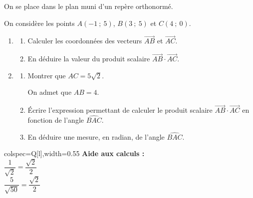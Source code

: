 On se place dans le plan muni d'un repère orthonormé.

On considère les points $A(-1\ ;\ 5)$, $B(3\ ;\ 5)$ et $C(4\ ;\ 0)$.

\begin{enumerate}
\item \begin{enumerate}
\item Calculer les coordonnées des vecteurs $\overrightarrow{AB}$ et $\overrightarrow{AC}$.
\item En déduire la valeur du produit scalaire $\overrightarrow{AB}\cdot\overrightarrow{AC}$.
\end{enumerate}
\item \begin{enumerate}
\item Montrer que $AC=5\sqrt{2}$.

On admet que $AB=4$.
\item Écrire l'expression permettant de calculer le produit scalaire $\overrightarrow{AB}\cdot\overrightarrow{AC}$ en fonction de l'angle $\widehat{BAC}$.
\item En déduire une mesure, en radian, de l'angle $\widehat{BAC}$.
\end{enumerate}
\end{enumerate}

\vfill
\begin{center}
\begin{tblr}{colspec={Q[l]},width=0.55\linewidth}
\textbf{Aide aux calculs :} \\
$\dfrac{1}{\sqrt{2}}=\dfrac{\sqrt{2}}{2}$ \\
$\dfrac{5}{\sqrt{50}}=\dfrac{\sqrt{2}}{2}$ \\
\end{tblr}
\end{center}

\clearpage
